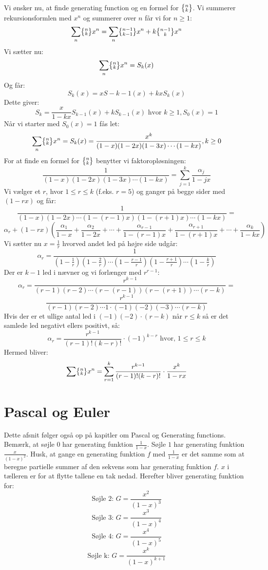 Vi ønsker nu, at finde generating function og en formel for \(\bigl\{ \negthinspace \begin{smallmatrix} n\\k \end{smallmatrix} \negthinspace \bigr\}\). Vi summerer rekursionsformlen med \(x^{n}\) og summerer over \(n\) får vi for \(n \geq 1\):
\[\sum_{n}\bigl\{ \negthinspace \begin{smallmatrix} n\\k \end{smallmatrix} \negthinspace \bigr\}x^{n}=\sum_{n}\bigl\{ \negthinspace \begin{smallmatrix} n-1\\k-1 \end{smallmatrix} \negthinspace \bigr\}x^{n}+k\bigl\{ \negthinspace \begin{smallmatrix} n-1\\k \end{smallmatrix} \negthinspace \bigr\}x^{n}\]
Vi sætter nu:
\[\sum_{n}\bigl\{ \negthinspace \begin{smallmatrix} n\\k \end{smallmatrix} \negthinspace \bigr\}x^{n}=S_{k}(x)\]
Og får:
\[S_{k}(x)=xS-{k-1}(x)+kxS_{k}(x)\]
Dette giver:
\[S_{k}=\frac{x}{1-kx}S_{k-1}(x)+kS_{k-1}(x) \text{ hvor } k \geq 1,S_{0}(x)=1\]
Når vi starter med \(S_{0}(x)=1\) fås let:
\[\sum_{n}\bigl\{ \negthinspace \begin{smallmatrix} n\\k \end{smallmatrix} \negthinspace \bigr\}x^{n}=S_{k}(x)=\frac{x^{k}}{(1-x)(1-2x)(1-3x) \dotsm (1-kx)}, k \geq 0\] 
For at finde en formel for \( \bigl\{ \negthinspace \begin{smallmatrix} n\\k \end{smallmatrix} \negthinspace \bigr\}\) benytter vi faktoropløsningen:
\[\frac{1}{(1-x)(1-2x)(1-3x) \dotsm (1-kx)}=\sum_{j=1}^{k}\frac{\alpha_{j}}{1-jx}\]
Vi vælger et \(r\), hvor \(1 \leq r \leq k\) (f.eks. \(r=5\)) og ganger på begge sider med \((1-rx)\) og får:
\[\frac{1}{(1-x)(1-2x) \dotsm (1-(r-1)x)(1-(r+1)x) \dotsm (1-kx)}=\]
\[\alpha_{r}+(1-rx)( \frac{\alpha_{1}}{1-x}+\frac{\alpha_{2}}{1-2x}+\dotsm+\frac{\alpha_{r-1}}{1-(r-1)x}+\frac{\alpha_{r+1}}{1-(r+1)x}+\dotsm +\frac{\alpha_{k}}{1-kx})\]
Vi sætter nu \(x=\frac{1}{r}\) hvorved andet led på højre side udgår:
\[\alpha_{r}=\frac{1}{(1-\frac{1}{r})(1-\frac{2}{r}) \dotsm (1-\frac{r-1}{r})(1-\frac{r+1}{r}) \dotsm (1-\frac{k}{r})}\]
Der er \(k-1\) led i nævner og vi forlænger med \(r^{r-1}\):
\[\alpha_{r}=\frac{r^{k-1}}{(r-1)(r-2) \dotsm (r-(r-1))(r-(r+1)) \dotsm (r-k)}=\]
\[\frac{r^{k-1}}{(r-1)(r-2) \dotsm 1 \cdot (-1)(-2)(-3) \dotsm (r-k)}\]
Hvis der er et ullige antal led i \( (-1)(-2) \cdot (r-k)\) når \(r \leq k\) så er det samlede led negativt ellers positivt, så:
\[\alpha_{r}=\frac{r^{k-1}}{(r-1)!(k-r)!}\cdot(-1)^{k-r} \text{ hvor, } 1 \leq r \leq k \]
Hermed bliver:
\[\sum \bigl\{ \negthinspace \begin{smallmatrix} n\\k \end{smallmatrix} \negthinspace \bigr\}x^{n}=\sum_{r=1}^{k}\frac{r^{k-1}}{(r-1)!(k-r)!} \cdot \frac{x^{k}}{1-rx}\]
\section{Pascal og Euler}
Dette afsnit følger også op på kapitler om Pascal og Generating functions.
Bemærk, at søjle \(0\) har generating funktion \(\frac{1}{1-x}\). Søjle \(1\) har generating funktion \(\frac{x}{(1-x)^{2}}\). Husk, at gange en generating funktion \(f\) med \(\frac{1}{1-x}\) er det samme som at beregne partielle summer af den sekvens som har generating funktion \(f\). \(x\) i tælleren er for at flytte tallene en tak nedad. Herefter bliver generating funktion for:
\[\text{Søjle 2: } G=\frac{x^{2}}{(1-x)^{3}}\]
\[\text{Søjle 3: } G=\frac{x^{3}}{(1-x)^{4}}\]
\[\text{Søjle 4: } G=\frac{x^{4}}{(1-x)^{5}}\]
\[\text{Søjle k: } G=\frac{x^{k}}{(1-x)^{k+1}}\]
